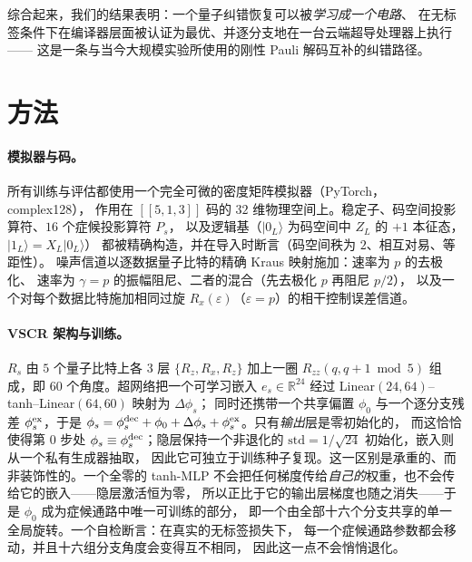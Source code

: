 \documentclass[11pt,a4paper]{article}
\newcommand{\ket}[1]{\lvert #1\rangle}
\newcommand{\code}{[\![5,1,3]\!]}
\begin{document}
综合起来，我们的结果表明：一个量子纠错恢复可以被\emph{学习成一个电路}、
在无标签条件下在编译器层面被认证为最优、并逐分支地在一台云端超导处理器上执行——
这是一条与当今大规模实验所使用的刚性 Pauli 解码互补的纠错路径。

\section*{方法}

\paragraph{模拟器与码。}
所有训练与评估都使用一个完全可微的密度矩阵模拟器（PyTorch，complex128），
作用在 $\code$ 码的 $32$ 维物理空间上。稳定子、码空间投影算符、$16$ 个症候投影算符 $P_s$，
以及逻辑基（$\ket{0_L}$ 为码空间中 $Z_L$ 的 $+1$ 本征态，$\ket{1_L}=X_L\ket{0_L}$）
都被精确构造，并在导入时断言（码空间秩为 $2$、相互对易、等距性）。
噪声信道以逐数据量子比特的精确 Kraus 映射施加：速率为 $p$ 的去极化、
速率为 $\gamma=p$ 的振幅阻尼、二者的混合（先去极化 $p$ 再阻尼 $p/2$），
以及一个对每个数据比特施加相同过旋 $R_x(\varepsilon)$（$\varepsilon=p$）的相干控制误差信道。

\paragraph{VSCR 架构与训练。}
$R_s$ 由 $5$ 个量子比特上各 $3$ 层 $\{R_z,R_x,R_z\}$ 加上一圈
$R_{zz}(q,q{+}1\bmod 5)$ 组成，即 $60$ 个角度。超网络把一个可学习嵌入
$e_s\in\mathbb{R}^{24}$ 经过 Linear$(24,64)$--tanh--Linear$(64,60)$ 映射为 $\Delta\phi_s$；
同时还携带一个共享偏置 $\phi_0$ 与一个逐分支残差 $\phi^{\rm ex}_s$，于是
$\phi_s=\phi^{\rm dec}_s+\phi_0+\Delta\phi_s+\phi^{\rm ex}_s$。只有\emph{输出}层是零初始化的，
而这恰恰使得第 $0$ 步处 $\phi_s\equiv\phi^{\rm dec}_s$；隐层保持一个非退化的
$\mathrm{std}=1/\sqrt{24}$ 初始化，嵌入则从一个私有生成器抽取，
因此它可独立于训练种子复现。这一区别是承重的、而非装饰性的。一个全零的 tanh-MLP
不会把任何梯度传给\emph{自己的}权重，也不会传给它的嵌入——隐层激活恒为零，
所以正比于它的输出层梯度也随之消失——于是 $\phi_0$ 成为症候通路中唯一可训练的部分，
即一个由全部十六个分支共享的单一全局旋转。一个自检断言：在真实的无标签损失下，
每一个症候通路参数都会移动，并且十六组分支角度会变得互不相同，
因此这一点不会悄悄退化。
\end{document}
